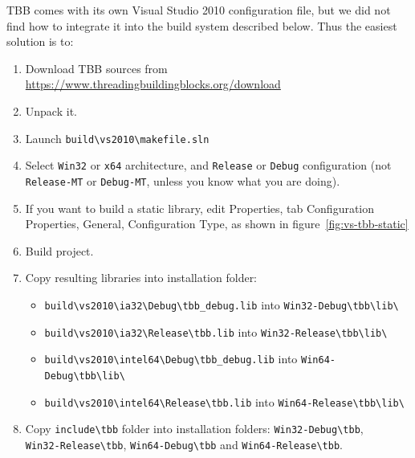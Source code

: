 TBB comes with its own Visual Studio 2010 configuration file, but we did not find how to integrate it into the build system described
below.  Thus the easiest solution is to:
\begin{enumerate}
\item Download TBB sources from \url{https://www.threadingbuildingblocks.org/download}
\item Unpack it.
\item Launch \verb+build\vs2010\makefile.sln+
\item Select \texttt{Win32} or \texttt{x64} architecture, and \texttt{Release} or \texttt{Debug} configuration (not \texttt{Release-MT} or \texttt{Debug-MT}, unless you know what you are doing).
\item If you want to build a static library, edit Properties, tab Configuration Properties, General, Configuration Type, as shown in figure~\ref{fig:vs-tbb-static}
\item Build project.
\item Copy resulting libraries into installation folder:
  \begin{itemize}
  \item \verb+build\vs2010\ia32\Debug\tbb_debug.lib+ into \verb+Win32-Debug\tbb\lib\+
  \item \verb+build\vs2010\ia32\Release\tbb.lib+ into \verb+Win32-Release\tbb\lib\+
  \item \verb+build\vs2010\intel64\Debug\tbb_debug.lib+ into \verb+Win64-Debug\tbb\lib\+
  \item \verb+build\vs2010\intel64\Release\tbb.lib+ into \verb+Win64-Release\tbb\lib\+
  \end{itemize}
\item Copy \verb+include\tbb+ folder into installation folders:
\verb+Win32-Debug\tbb+,\\
\verb+Win32-Release\tbb+,
\verb+Win64-Debug\tbb+
and \verb+Win64-Release\tbb+.
\end{enumerate}

